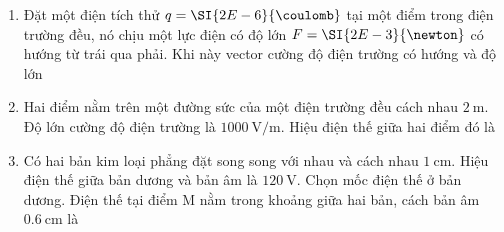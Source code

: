 \begin{enumerate}[label=\bfseries Câu \arabic*:, leftmargin=1.0cm]
\item Đặt một điện tích thử $q=\SI{2E-6}{\coulomb}$ tại một điểm trong điện trường đều, nó chịu một lực điện có độ lớn $F=\SI{2E-3}{\newton}$ có hướng từ trái qua phải. Khi này vector cường độ điện trường có hướng và độ lớn

\item Hai điểm nằm trên một đường sức của một điện trường đều cách nhau $\SI{2}{\meter}$. Độ lớn cường độ điện trường là $\SI{1000}{\volt/\meter}$. Hiệu điện thế giữa hai điểm đó là 

\item Có hai bản kim loại phẳng đặt song song với nhau và cách nhau $\SI{1}{\centi\meter}$. Hiệu điện thế giữa bản dương và bản âm là $\SI{120}{\volt}$. Chọn mốc điện thế ở bản dương. Điện thế tại điểm M nằm trong khoảng giữa hai bản, cách bản âm $\SI{0.6}{\centi\meter}$ là


\end{enumerate}
